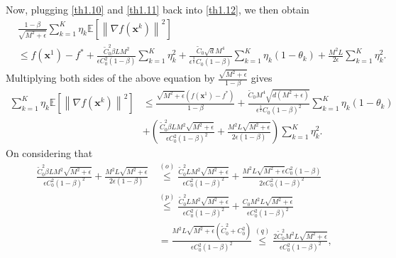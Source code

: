 \documentclass[twoside,11pt]{article}
\begin{document}
Now, plugging \eqref{th1.10} and \eqref{th1.11} back into \eqref{th1.12}, we then obtain
\begin{equation}\label{en.7}
   	\begin{aligned}
   	&\frac{1-\beta}{\sqrt{M^2+\epsilon}}\sum_{k=1}^{K}\eta_k\mathbb{E}\left[\left\| \nabla f(\mathbf{x}^k)\right\|^2\right]\\
   	&\le f(\mathbf{x}^1)-f^*
   	+\frac{\tilde{C}_0^2\beta L M^2}{\epsilon C_0^2(1-\beta)} \sum_{k=1}^{K}\eta_{k}^2 
   	+{\frac{\tilde{C}_0\sqrt{d}  M^4}{\epsilon^{\frac{3}{2}}C_0(1-\beta)}}\sum_{k=1}^{K}\eta_k(1-\theta_k)
   	+\frac{M^2L}{2\epsilon}\sum_{k=1}^{K}\eta_k^2.
   	\end{aligned}
\end{equation}
Multiplying both sides of the above equation by $\frac{\sqrt{M^2+\epsilon}}{1-\beta}$ gives
\begin{equation}\label{th1.20}
   	\begin{aligned}
   	\sum_{k=1}^{K}\eta_k\mathbb{E}\left[\left\| \nabla f(\mathbf{x}^k)\right\|^2\right]
   	&\le\frac{\sqrt{M^2+\epsilon}\left( f(\mathbf{x}^1)-f^*\right) }{1-\beta}
   	+\frac{\tilde{C}_0 M^4\sqrt{d(M^2+\epsilon)}}{\epsilon^{\frac{3}{2}}C_0(1-\beta)^2}\sum_{k=1}^{K}\eta_k(1-\theta_k)\\
   	&+\left( \frac{\tilde{C}_0^2\beta L M^2\sqrt{M^2+\epsilon}}{\epsilon C_0^2(1-\beta)^2}+\frac{M^2L\sqrt{M^2+\epsilon}}{2\epsilon(1-\beta)}\right) \sum_{k=1}^{K}\eta_{k}^2.
   	\end{aligned}
\end{equation}
On considering that
\begin{equation}\label{th1.21}
   	\begin{aligned}
    \frac{\tilde{C}_0^2\beta L M^2\sqrt{M^2+\epsilon}}{\epsilon C_0^2(1-\beta)^2}+\frac{M^2L\sqrt{M^2+\epsilon}}{2\epsilon(1-\beta)}
   	&\overset{(o)}{\le}\frac{\tilde{C}_0^2 L M^2\sqrt{M^2+\epsilon}}{\epsilon C_0^2(1-\beta)^2}+\frac{M^2L\sqrt{M^2+\epsilon}C_0^2(1-\beta)}{2\epsilon C_0^2(1-\beta)^2}\\
   	&\overset{(p)}{\le}\frac{\tilde{C}_0^2 L M^2\sqrt{M^2+\epsilon}}{\epsilon C_0^2(1-\beta)^2}+\frac{C_0 M^2L\sqrt{M^2+\epsilon}}{\epsilon C_0^2(1-\beta)^2}\\
   	&\,=\frac{M^2L\sqrt{M^2+\epsilon}(\tilde{C}_0^2+C_0^2)}{\epsilon C_0^2(1-\beta)^2}
   	\overset{(q)}{\le}\frac{2\tilde{C}_0^2 M^2L\sqrt{M^2+\epsilon}}{\epsilon C_0^2(1-\beta)^2},
   	\end{aligned}
\end{equation}
\end{document}
